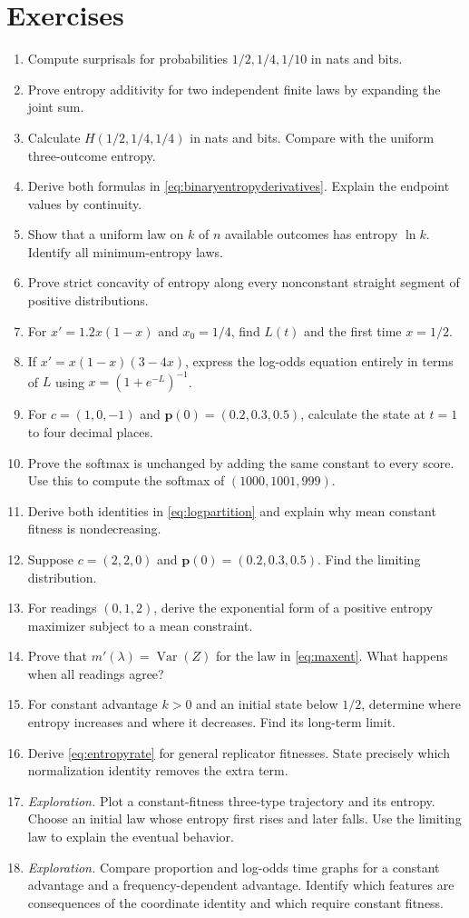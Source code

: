 \documentclass[11pt,oneside,openany]{book}
\theoremstyle{definition}
\theoremstyle{remark}
\newenvironment{exercises}{\begin{enumerate}[label=\thechapter.\arabic*,ref=\thechapter.\arabic*,leftmargin=2.8em,itemsep=6pt]}{\end{enumerate}}
\newcommand{\Var}{\operatorname{Var}}
\newcommand{\p}{\mathbf{p}}
\numberwithin{equation}{chapter}
\begin{document}
\section{Exercises}
\begin{exercises}
\item Compute surprisals for probabilities $1/2,1/4,1/10$ in nats and bits.
\item Prove entropy additivity for two independent finite laws by expanding the joint sum.
\item Calculate $H(1/2,1/4,1/4)$ in nats and bits. Compare with the uniform three-outcome entropy.
\item Derive both formulas in \eqref{eq:binaryentropyderivatives}. Explain the endpoint values by continuity.
\item Show that a uniform law on $k$ of $n$ available outcomes has entropy $\ln k$. Identify all minimum-entropy laws.
\item Prove strict concavity of entropy along every nonconstant straight segment of positive distributions.
\item For $x'=1.2x(1-x)$ and $x_0=1/4$, find $L(t)$ and the first time $x=1/2$.
\item If $x'=x(1-x)(3-4x)$, express the log-odds equation entirely in terms of $L$ using $x=(1+e^{-L})^{-1}$.
\item For $c=(1,0,-1)$ and $\p(0)=(0.2,0.3,0.5)$, calculate the state at $t=1$ to four decimal places.
\item Prove the softmax is unchanged by adding the same constant to every score. Use this to compute the softmax of $(1000,1001,999)$.
\item Derive both identities in \eqref{eq:logpartition} and explain why mean constant fitness is nondecreasing.
\item Suppose $c=(2,2,0)$ and $\p(0)=(0.2,0.3,0.5)$. Find the limiting distribution.
\item For readings $(0,1,2)$, derive the exponential form of a positive entropy maximizer subject to a mean constraint.
\item Prove that $m'(\lambda)=\Var(Z)$ for the law in \eqref{eq:maxent}. What happens when all readings agree?
\item For constant advantage $k>0$ and an initial state below $1/2$, determine where entropy increases and where it decreases. Find its long-term limit.
\item Derive \eqref{eq:entropyrate} for general replicator fitnesses. State precisely which normalization identity removes the extra term.
\item \emph{Exploration.} Plot a constant-fitness three-type trajectory and its entropy. Choose an initial law whose entropy first rises and later falls. Use the limiting law to explain the eventual behavior.
\item \emph{Exploration.} Compare proportion and log-odds time graphs for a constant advantage and a frequency-dependent advantage. Identify which features are consequences of the coordinate identity and which require constant fitness.
\end{exercises}
\end{document}
